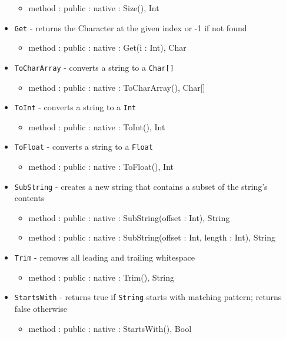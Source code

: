 \documentclass[12pt]{article}
\begin{document}
\begin{itemize}
  \begin{itemize}
  \item method : public : native : Size(), Int
  \end{itemize}
\item \texttt{Get} - returns the Character at the given index or -1 if not found
  \begin{itemize}
  \item method : public : native : Get(i : Int), Char
  \end{itemize}
\item \texttt{ToCharArray} - converts a string to a \texttt{Char[]}
  \begin{itemize}
  \item method : public : native : ToCharArray(), Char[]
  \end{itemize}
\item \texttt{ToInt} - converts a string to a \texttt{Int}
  \begin{itemize}
  \item method : public : native : ToInt(), Int
  \end{itemize}
\item \texttt{ToFloat} - converts a string to a \texttt{Float}
  \begin{itemize}
  \item method : public : native : ToFloat(), Int
  \end{itemize}
\item \texttt{SubString} - creates a new string that contains a subset of the string's contents
  \begin{itemize}
  \item method : public : native : SubString(offset : Int), String
  \item method : public : native : SubString(offset : Int, length : Int), String
  \end{itemize}
\item \texttt{Trim} - removes all leading and trailing whitespace
  \begin{itemize}
  \item method : public : native : Trim(), String
  \end{itemize}
\item \texttt{StartsWith} - returns true if \texttt{String} starts with matching pattern; returns false otherwise
  \begin{itemize}
  \item method : public : native : StartsWith(), Bool
  \end{itemize}

\end{itemize}
\end{document}
